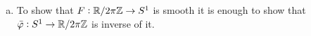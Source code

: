 \begin{solution}
\begin{enumerate}[(a)]
		\item To show that $ F:\mathbb{R}/2\pi\mathbb{Z} \to S^1 $ is smooth it is enough to show that $ \bar{\varphi} : S^1 \to \mathbb{R}/2\pi\mathbb{Z} $ is inverse of it.
	\end{enumerate}
\end{solution}

\newpage
